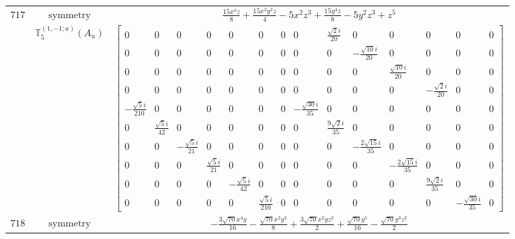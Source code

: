 \documentclass[fleqn,8pt,landscape]{jsarticle}
\begin{document}
\begin{longtable}{ccc}
$ 717 $ & $ \text{symmetry} $ & $ \frac{15 x^{4} z}{8} + \frac{15 x^{2} y^{2} z}{4} - 5 x^{2} z^{3} + \frac{15 y^{4} z}{8} - 5 y^{2} z^{3} + z^{5} $ \\
$  $ & $ \mathbb{T}_{5}^{(1,-1;a)}(A_{u}) $ & $ \begin{bmatrix} 0 & 0 & 0 & 0 & 0 & 0 & 0 & 0 & \frac{\sqrt{2} i}{20} & 0 & 0 & 0 & 0 & 0 \\ 0 & 0 & 0 & 0 & 0 & 0 & 0 & 0 & 0 & - \frac{\sqrt{10} i}{20} & 0 & 0 & 0 & 0 \\ 0 & 0 & 0 & 0 & 0 & 0 & 0 & 0 & 0 & 0 & \frac{\sqrt{10} i}{20} & 0 & 0 & 0 \\ 0 & 0 & 0 & 0 & 0 & 0 & 0 & 0 & 0 & 0 & 0 & - \frac{\sqrt{2} i}{20} & 0 & 0 \\ - \frac{\sqrt{5} i}{210} & 0 & 0 & 0 & 0 & 0 & 0 & - \frac{\sqrt{30} i}{35} & 0 & 0 & 0 & 0 & 0 & 0 \\ 0 & \frac{\sqrt{5} i}{42} & 0 & 0 & 0 & 0 & 0 & 0 & \frac{9 \sqrt{2} i}{35} & 0 & 0 & 0 & 0 & 0 \\ 0 & 0 & - \frac{\sqrt{5} i}{21} & 0 & 0 & 0 & 0 & 0 & 0 & - \frac{2 \sqrt{15} i}{35} & 0 & 0 & 0 & 0 \\ 0 & 0 & 0 & \frac{\sqrt{5} i}{21} & 0 & 0 & 0 & 0 & 0 & 0 & - \frac{2 \sqrt{15} i}{35} & 0 & 0 & 0 \\ 0 & 0 & 0 & 0 & - \frac{\sqrt{5} i}{42} & 0 & 0 & 0 & 0 & 0 & 0 & \frac{9 \sqrt{2} i}{35} & 0 & 0 \\ 0 & 0 & 0 & 0 & 0 & \frac{\sqrt{5} i}{210} & 0 & 0 & 0 & 0 & 0 & 0 & - \frac{\sqrt{30} i}{35} & 0 \end{bmatrix} $ \\ \hline
$ 718 $ & $ \text{symmetry} $ & $ - \frac{3 \sqrt{70} x^{4} y}{16} - \frac{\sqrt{70} x^{2} y^{3}}{8} + \frac{3 \sqrt{70} x^{2} y z^{2}}{2} + \frac{\sqrt{70} y^{5}}{16} - \frac{\sqrt{70} y^{3} z^{2}}{2} $ \\

\end{longtable}
\end{document}
